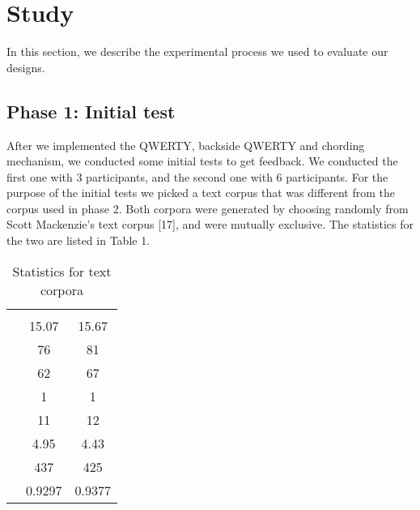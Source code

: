 \section{Study}

In this section, we describe the experimental process we used to evaluate our designs.

\subsection{Phase 1: Initial test}

After we implemented the QWERTY, backside QWERTY and chording
mechanism, we conducted some initial tests to get feedback. We
conducted the first one with 3 participants, and the
second one with 6 participants. For the purpose of the initial tests
we picked a text corpus that was different from the corpus used in
phase 2. Both corpora were generated by choosing randomly from Scott
Mackenzie's text corpus [17], and were mutually exclusive. The
statistics for the two are listed in Table 1.

\begin{table}
	\centering
		\begin{tabular}{rcc}
		                         & \begin{minipage}{2cm} \centering \color{grey}{Study corpus}\end{minipage} & \begin{minipage}{2cm} \centering \color{grey}{Initial test corpus}\end{minipage}  \\ 
			 \color{grey}{Average phrase length} & 15.07 & 15.67 \\ 
			 \color{grey}{Number of words} & 76 & 81 \\ 
			 \color{grey}{Unique words} & 62 & 67 \\ 
			 \color{grey}{Min. length of word} & 1 & 1 \\ 
			 \color{grey}{Max. length of word} & 11 & 12 \\ 
			 \color{grey}{Average word length} & 4.95 & 4.43 \\ 
			 \color{grey}{Number of characters} & 437 & 425 \\ 
			 \color{grey}{Correlation with English} & 0.9297 & 0.9377 \\ 
		\end{tabular}
	\caption{Statistics for text corpora}
	\label{tab:StatisticsForTextCorpora}
\end{table}

